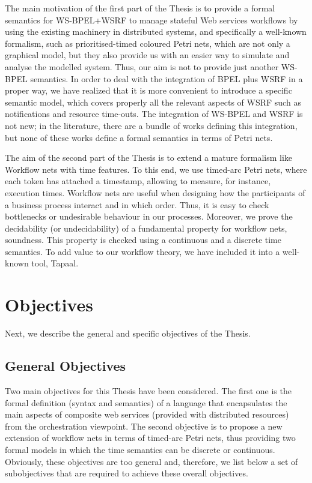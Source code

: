 The main motivation of the first part of the Thesis is to provide a formal 
semantics for WS-BPEL+WSRF to manage stateful Web services workflows 
by using the existing machinery in distributed systems,
and specifically a well-known formalism, such as prioritised-timed
coloured Petri nets, which are not only a graphical model, but they also
provide us with an easier way to simulate and analyse the modelled
system. Thus, our aim is not to provide just another WS-BPEL semantics. 
In order to deal with the integration of BPEL plus WSRF in a proper way, 
we have realized that it is more convenient 
to introduce a specific semantic model, which  covers 
properly all the relevant aspects of WSRF such as notifications and 
resource time-outs. 
The integration of WS-BPEL and WSRF is not new; in the literature, 
there are a bundle of works defining this integration, but 
none of these works define a formal semantics in terms of Petri
nets.

The aim of the second part of the Thesis is to extend a mature formalism like
Workflow nets with time features. To this end, we use timed-arc Petri nets, where
each token has attached a timestamp, allowing to measure, for instance, execution times. 
Workflow nets are useful when designing how the participants of a business process interact
and in which order. Thus, it is easy to check bottlenecks or undesirable behaviour in our processes.
Moreover, we prove the decidability (or undecidability) of a fundamental property for workflow nets, soundness.
This property is checked using a continuous and a discrete time semantics. To add value to our workflow theory, we have included
it into a well-known tool, Tapaal.
 
\section{Objectives}\label{objectives}

Next, we describe the general and specific objectives of the Thesis.

\subsection*{General Objectives}

Two main objectives for this Thesis have been considered. The first one is the formal definition (syntax and semantics)
of a language that encapsulates the main aspects of composite web services (provided with distributed resources) 
from the orchestration viewpoint.  
The second objective is to propose a new extension of workflow nets in terms 
of timed-arc Petri nets, thus providing two formal models in which the time semantics can be discrete or continuous. 
Obviously, these objectives are too general and, therefore, we list below a set of subobjectives that are
required to achieve these overall objectives.


